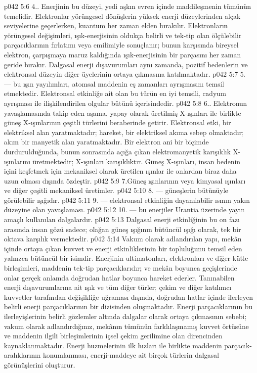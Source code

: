 \vs p042 5:6 4.\bibnobreakspace {}. Enerjinin bu düzeyi, yedi aşkın evren içinde maddileşmenin tümünün temelidir. Elektronlar yörüngesel dönüşlerin yüksek enerji düzeylerinden alçak seviyelerine geçerlerken, kuantum her zaman elden bırakılır. Elektronların yörüngesel değişimleri, ışık\hyp{}enerjisinin oldukça belirli ve tek\hyp{}tip olan ölçülebilir parçacıklarının fırlatımı veya emilimiyle sonuçlanır; bunun karşısında bireysel elektron, çarpışmaya maruz kaldığında ışık\hyp{}enerjisinin bir parçasını her zaman geride bırakır. Dalgasal enerji dışavurumları aynı zamanda, pozitif bedenlerin ve elektronsal düzeyin diğer üyelerinin ortaya çıkmasına katılmaktadır.
\vs p042 5:7 5.\bibnobreakspace {} --- bu ışın yayılımları, atomsal maddenin eş zamanları ayrışmasını temsil etmektedir. Elektronsal etkinliğe ait olan bu türün en iyi temsili, radyum ayrışması ile ilişkilendirilen olgular bütünü içerisindedir.
\vs p042 5:8 6.\bibnobreakspace {}. Elektronun yavaşlamasında takip eden aşama, yapay olarak üretilmiş X\hyp{}ışınları ile birlikte güneş X\hyp{}ışınlarının çeşitli türlerini beraberinde getirir. Elektronsal etki, bir elektriksel alan yaratmaktadır; hareket, bir elektriksel akıma sebep olmaktadır; akım bir manyetik alan yaratmaktadır. Bir elektron ani bir biçimde durdurulduğunda, bunun sonrasında açığa çıkan elektromanyetik karışıklık X\hyp{}ışınlarını üretmektedir; X\hyp{}ışınları  karışıklıktır. Güneş X\hyp{}ışınları, insan bedenin içini keşfetmek için mekaniksel olarak üretilen ışınlar ile onlardan biraz daha uzun olması dışında özdeştir.
\vs p042 5:9 7.\bibnobreakspace Güneş ışınlarının  veya kimyasal ışınları ve diğer çeşitli mekaniksel üretimler.
\vs p042 5:10 8.\bibnobreakspace {} --- güneşlerin bütünüyle görülebilir ışığıdır.
\vs p042 5:11 9. --- elektronsal etkinliğin dayanılabilir ısının yakın düzeyine olan yavaşlaması.
\vs p042 5:12 10.\bibnobreakspace {} --- bu enerjiler Urantia üzerinde yayın amaçlı kullanılan dalgalardır.
\vs p042 5:13 Dalgasal enerji etkinliğinin bu on fazı arasında insan gözü sadece; olağan güneş ışığının bütüncül ışığı olarak, tek bir oktava karşılık vermektedir.
\vs p042 5:14 Vakum olarak adlandırılan yapı, mekân içinde ortaya çıkan kuvvet ve enerji etkinliklerinin bir topluluğunu temsil eden yalnızca bütüncül bir isimdir. Enerjinin ultimatonları, elektronları ve diğer kütle birleşimleri, maddenin tek\hyp{}tip parçacıklarıdır; ve mekân boyunca geçişlerinde onlar gerçek anlamda doğrudan hatlar boyunca hareket ederler. Tanınabilen enerji dışavurumlarına ait ışık ve tüm diğer türler; çekim ve diğer katılımcı kuvvetler tarafından değişikliğe uğraması dışında, doğrudan hatlar içinde ilerleyen belirli enerji parçacıklarının bir dizisinden oluşmaktadır. Enerji parçacıklarının bu ilerleyişlerinin belirli gözlemler altında dalgalar olarak ortaya çıkmasının sebebi; vakum olarak adlandırdığınız, mekânın tümünün farklılaşmamış kuvvet örtüsüne ve maddenin ilgili birleşimlerinin içsel çekim gerilimine olan direncinden kaynaklanmaktadır. Enerji huzmelerinin ilk hızları ile birlikte maddenin parçacık\hyp{}aralıklarının konumlanması, enerji\hyp{}maddeye ait birçok türlerin dalgasal görünüşlerini oluşturur.
